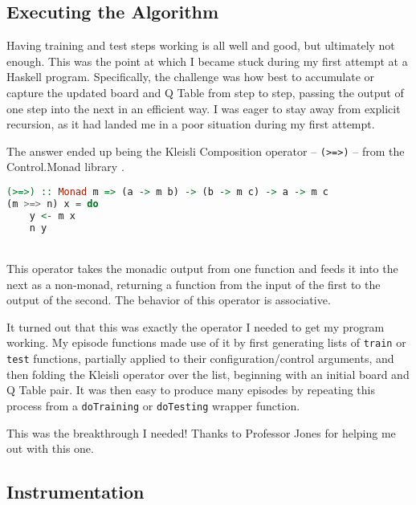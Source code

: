 \documentclass[12pt,a4paper]{article}
\begin{document}
		\subsection{Executing the Algorithm}
		
		\par Having training and test steps working is all well and good, but ultimately not enough. This was the point at which I became stuck during my first attempt at a Haskell program. Specifically, the challenge was how best to accumulate or capture the updated board and Q Table from step to step, passing the output of one step into the next in an efficient way. I was eager to stay away from explicit recursion, as it had landed me in a poor situation during my first attempt.
		\par The answer ended up being the Kleisli Composition operator -- \texttt{(>=>)} -- from the Control.Monad library \cite{kleisli}. \\
		
		\begin{lstlisting}[language=Haskell,numbers=none]
(>=>) :: Monad m => (a -> m b) -> (b -> m c) -> a -> m c
(m >=> n) x = do
	y <- m x
	n y
		\end{lstlisting}\ \\
		
		This operator takes the monadic output from one function and feeds it into the next as a non-monad, returning a function from the input of the first to the output of the second. The behavior of this operator is associative.
		\par It turned out that this was exactly the operator I needed to get my program working. My episode functions made use of it by first generating lists of \texttt{train} or \texttt{test} functions, partially applied to their configuration/control arguments, and then folding the Kleisli operator over the list, beginning with an initial board and Q Table pair. It was then easy to produce many episodes by repeating this process from a \texttt{doTraining} or \texttt{doTesting} wrapper function. 
		\par This was the breakthrough I needed! Thanks to Professor Jones for helping me out with this one.
		
		\subsection{Instrumentation}\label{inst}
		
\end{document}
